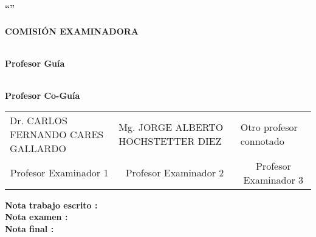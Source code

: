 \null
\vfill

\begin{center}
	\textbf{ \uppercase{\nombre \\ \anyo}}
\end{center}

\clearpage

\leftskip=0cm
\rightskip=0cm
\setlength{\parindent}{0cm}

\begin{center}
	\textbf{ \uppercase{
	``\titulotesis'' \\
	\vspace{5 mm}
	\nombre \\
	\vspace{5 mm}
	comisión examinadora
	} }
	\vspace{25 mm}

	\textbf{ \uppercase{\profesorguia} \\
		Profesor Guía
	}
	
	\vspace*{1.5cm}
		
	\textbf{ \uppercase{\profesorcoguia} \\
		Profesor Co-Guía
	}

\end{center}

\vspace{4cm}

\begin{tabularx}{\textwidth}{ X X X } 
	Dr. CARLOS FERNANDO CARES GALLARDO & Mg. JORGE ALBERTO HOCHSTETTER DIEZ  & Otro profesor connotado\\
	\multicolumn{1}{c}{Profesor Examinador 1} &	\multicolumn{1}{c}{Profesor Examinador 2} & \multicolumn{1}{c}{Profesor Examinador 3} \\					
\end {tabularx}
\vfill
\begin{flushright}
	\textbf{Nota trabajo escrito :} \tab{} \\ 	
	\textbf{Nota examen :} \tab{} \\ 
	\textbf{Nota final :} \tab{} \\ 		
\end{flushright}

